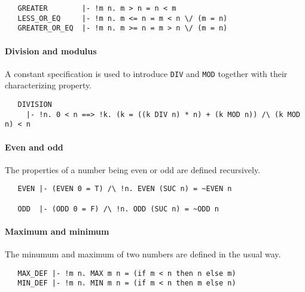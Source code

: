 \begin{hol}
{\small
\begin{verbatim}
   GREATER        |- !m n. m > n = n < m
   LESS_OR_EQ     |- !m n. m <= n = m < n \/ (m = n)
   GREATER_OR_EQ  |- !m n. m >= n = m > n \/ (m = n)
\end{verbatim}}
\end{hol}

\paragraph{Division and modulus}

A constant specification is used to introduce {\small\verb+DIV+} and
{\small\verb+MOD+} together with their characterizing property.
\begin{hol}
{\small
\begin{verbatim}
   DIVISION
     |- !n. 0 < n ==> !k. (k = ((k DIV n) * n) + (k MOD n)) /\ (k MOD n) < n
\end{verbatim}}
\end{hol}

\paragraph{Even and odd}

The properties of a number being even or odd are defined recursively.
%
\begin{hol}
{\small
\begin{verbatim}
   EVEN |- (EVEN 0 = T) /\ !n. EVEN (SUC n) = ~EVEN n

   ODD  |- (ODD 0 = F) /\ !n. ODD (SUC n) = ~ODD n
\end{verbatim}}
\end{hol}

\paragraph{Maximum and minimum}

The minumum and maximum of two numbers are defined in the usual way.
%
\begin{hol}
{\small
\begin{verbatim}
   MAX_DEF |- !m n. MAX m n = (if m < n then n else m)
   MIN_DEF |- !m n. MIN m n = (if m < n then m else n)
\end{verbatim}}
\end{hol}

